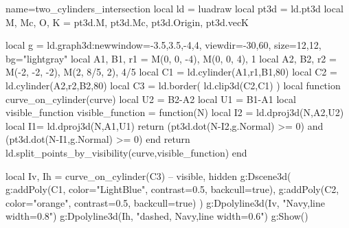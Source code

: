 \documentclass{standalone}
\begin{document}
\begin{luadraw}{name=two_cylinders_intersection}
local ld = luadraw
local pt3d = ld.pt3d
local M, Mc, O, K = pt3d.M, pt3d.Mc, pt3d.Origin, pt3d.vecK

local g = ld.graph3d:new{window={-3.5,3.5,-4,4}, viewdir={-30,60}, size={12,12}, bg="lightgray"}
local A1, B1, r1 = M(0, 0, -4), M(0, 0, 4), 1
local A2, B2, r2 = M(-2, -2, -2), M(2, 8/5, 2), 4/5
local C1 = ld.cylinder(A1,r1,B1,80)
local C2 = ld.cylinder(A2,r2,B2,80)
local C3 = ld.border( ld.clip3d(C2,C1) )
local function curve_on_cylinder(curve)
    local U2 = B2-A2
    local U1 = B1-A1
    local visible_function
        visible_function = function(N)
            local I2 = ld.dproj3d(N,{A2,U2})
            local I1= ld.dproj3d(N,{A1,U1})
            return (pt3d.dot(N-I2,g.Normal) >= 0) and (pt3d.dot(N-I1,g.Normal) >= 0)
        end
    return ld.split_points_by_visibility(curve,visible_function)
end

local Iv, Ih = curve_on_cylinder(C3) -- visible, hidden
g:Dscene3d(
    g:addPoly(C1, {color="LightBlue", contrast=0.5, backcull=true}),
    g:addPoly(C2, {color="orange", contrast=0.5, backcull=true})
)
g:Dpolyline3d(Iv, "Navy,line width=0.8")
g:Dpolyline3d(Ih, "dashed, Navy,line width=0.6")
g:Show()
\end{luadraw}
\end{document}
